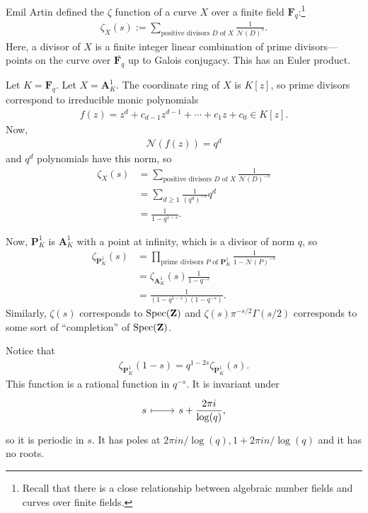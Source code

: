 \documentclass [11 pt, oneside] {article}
\begin{document}
Emil Artin defined the $\zeta$ function of a curve $X$ over a finite field $\mathbf{F}_{q}$:\footnote{Recall that there is a close relationship between algebraic number fields and curves over finite fields.}
\begin{align*}
	\zeta_X(s) :=  \sum_{\textrm{positive divisors $D$ of $X$}}^{} \frac{1}{\mathscr{N}(D) ^s}.
\end{align*}
Here, a divisor of $X$ is a finite integer linear combination of prime divisors---points on the curve over $\overline{\mathbf{F}_{q}}$ up to Galois conjugacy.
This has an Euler product.

\begin{example}[ ]\label{}\text{}
Let $K = \mathbf{F}_{q}$. Let $X=\mathbf{A}^1_K$. The coordinate ring of $X$ is $K[z]$, so prime divisors correspond to irreducible monic polynomials
\begin{align*}
	f(z) = z^d + c_{d-1}z^{d-1} +\cdots + c_1z +  c_0\in K[z].
\end{align*}
Now,
\begin{align*}
	\mathscr{N}(f(z)) = q^d
\end{align*}
and $q^d$ polynomials have this norm, so
\begin{align*}
	\zeta_X(s) &= \sum_{\textrm{positive divisors $D$ of $X$}}^{} \frac{1}{\mathscr{N}(D) ^{-s}}\\
		   &= \sum_{d\ge 1}^{} \frac{1}{(q^d) ^{-s}}q^d\\
		   &= \frac{1}{1-q^{1-s}}.
\end{align*}

Now, $\mathbf{P}^1_K$ is $\mathbf{A}^1_K$ with a point at infinity, which is a divisor of norm $q$, so
\begin{align*}
	\zeta_{\mathbf{P}^1_K}(s) &= \prod_{\textrm{prime divisors $P$ of $\mathbf{P}^1_K$}} \frac{1}{1-\mathscr{N}(P) ^{-s}}\\
		   &= \zeta_{\mathbf{A}^1_K} (s)  \frac{1}{1-q^{-s}}\\
		   &= \frac{1}{(1-q^{1-s}) (1-q^{-s})}.
\end{align*}
Similarly, $\zeta(s)$ corresponds to $\operatorname{Spec}(\mathbf{Z})$ and $\zeta(s) \pi^{-s/2}\Gamma(s/2)$ corresponds to some sort of ``completion'' of $\operatorname{Spec}(\mathbf{Z})$.

Notice that
\begin{align*}
	\zeta_{\mathbf{P}^1_K}(1-s) = q^{1-2s}\zeta_{\mathbf{P}^1_K} (s).
\end{align*}
This function is a rational function in $q^{-s}$. It is invariant under
\[
\begin{tikzcd}
	s\ar[r,mapsto] & \displaystyle s + \frac{2\pi i}{\log(q)},
\end{tikzcd}
\]
so it is periodic in $s$.
It has poles at $2\pi i n/\log(q), 1+2\pi i n/\log (q)$ and it has no roots.
\end{example}
\end{document}
